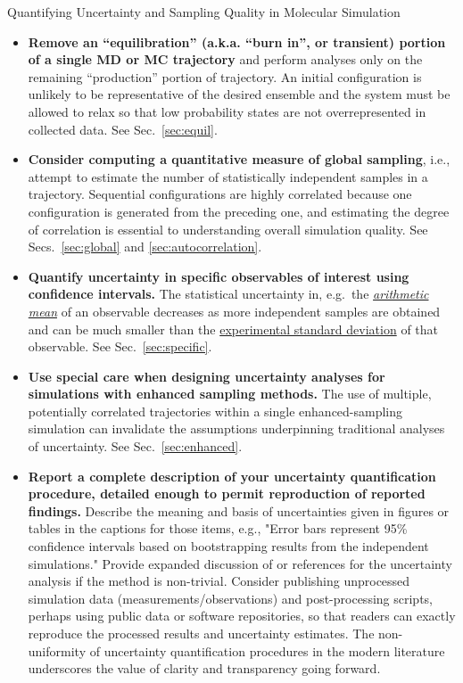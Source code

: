 \begin{Checklists*}[p!]
\begin{checklist}{Quantifying Uncertainty and Sampling Quality in Molecular Simulation}
\begin{itemize}
\item
  \textbf{Remove an ``equilibration'' (a.k.a. ``burn in'', or transient) portion of a single MD or MC trajectory} and perform analyses only on the remaining ``production'' portion of trajectory.  An initial configuration is unlikely to be representative of the desired ensemble and the system must be allowed to relax so that low probability states are not overrepresented in collected data.  See Sec.\ \ref{sec:equil}.
 
\item
  \textbf{Consider computing a quantitative measure of global sampling}, i.e., attempt to estimate the number of statistically independent samples in a trajectory.  Sequential configurations are highly correlated because one configuration is generated from the preceding one, and estimating the degree of correlation is essential to understanding overall simulation quality.
  See Secs.\ \ref{sec:global} and \ref{sec:autocorrelation}.

\item
  \textbf{Quantify uncertainty in specific observables of interest using confidence intervals.}
  The statistical uncertainty in, e.g.\ the \hyperref[def:arith_mean]{\emph{arithmetic mean}} of an observable decreases as more independent samples are obtained and can be much smaller than the \hyperref[def:exp_st_dev]{experimental standard deviation} of that observable.
  See Sec.\ \ref{sec:specific}.
 
\item
  \textbf{Use special care when designing uncertainty analyses for simulations with enhanced sampling methods.}
  The use of multiple, potentially correlated trajectories within a single enhanced-sampling simulation can invalidate the assumptions underpinning traditional analyses of uncertainty.
  See Sec.\ \ref{sec:enhanced}.

\item
\textbf{Report a complete description of your uncertainty quantification procedure, detailed enough to permit reproduction of reported findings.}
Describe the meaning and basis of uncertainties given in figures or tables in the captions for those items, e.g., "Error bars represent 95\% confidence intervals based on bootstrapping results from the independent simulations."
Provide expanded discussion of or references for the uncertainty analysis if the method is non-trivial.
Consider publishing unprocessed simulation data (measurements/observations) and post-processing scripts, perhaps using public data or software repositories, so that readers can exactly reproduce the processed results and uncertainty estimates. 
The non-uniformity of uncertainty quantification procedures in the modern literature underscores the value of clarity and transparency going forward.

\end{itemize}
\end{checklist}
\end{Checklists*}
